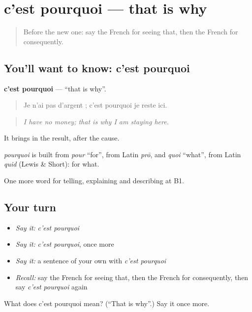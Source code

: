 \section[c'est pourquoi]{c'est pourquoi — that is why}

\label{lesson:FR-C347-c-est-pourquoi}



\begin{quote}
Before the new one: say the French for seeing that, then the French for consequently.
\end{quote}

\subsection*{You'll want to know: c'est pourquoi}
\textbf{c'est pourquoi} — \textquotedblleft{}that is why\textquotedblright{}.

\begin{quote}
Je n'ai pas d'argent ; c'est pourquoi je reste ici.
\end{quote}

\begin{quote}
\emph{I have no money; that is why I am staying here.}
\end{quote}

It brings in the result, after the cause.

\begin{cousinweb}
\emph{pourquoi} is built from \emph{pour} \textquotedblleft{}for\textquotedblright{}, from Latin \emph{prō}, and \emph{quoi} \textquotedblleft{}what\textquotedblright{}, from Latin \emph{quid} (Lewis \& Short): for what.
\end{cousinweb}

\begin{grammarlens}[title={What you've built}]
One more word for telling, explaining and describing at B1.
\end{grammarlens}

\subsection*{Your turn}
\begin{itemize}
\raggedright
  \item \emph{Say it:} \emph{c'est pourquoi}
  \item \emph{Say it:} \emph{c'est pourquoi}, once more
  \item \emph{Say it:} a sentence of your own with \emph{c'est pourquoi}
  \item \emph{Recall:} say the French for seeing that, then the French for consequently, then say \emph{c'est pourquoi} again
\end{itemize}

\begin{tcolorbox}[breakable,colback=teal!4,colframe=teal!35!black,title={Before you move on}]
What does c'est pourquoi mean? (\textquotedblleft{}That is why\textquotedblright{}.) Say it once more.
\end{tcolorbox}
